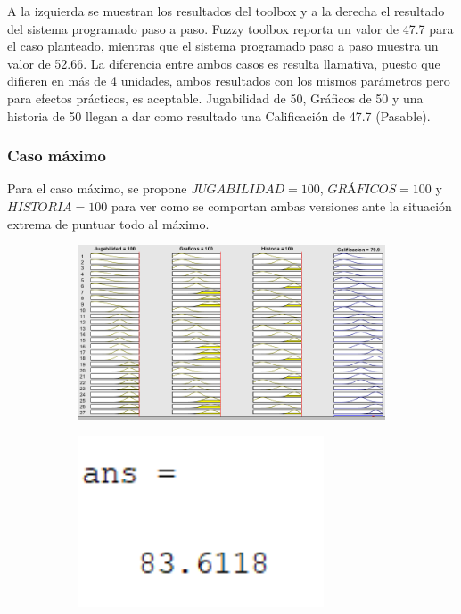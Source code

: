 \documentclass[11pt, letterpaper]{article}
\begin{document}
A la izquierda se muestran los resultados del toolbox y a la derecha el resultado del sistema programado paso a paso. 
Fuzzy toolbox reporta un valor de 47.7 para el caso planteado, mientras que el sistema programado paso a paso muestra un valor de 52.66. La diferencia entre ambos casos es resulta llamativa, puesto que difieren en más de 4 unidades, ambos resultados con los mismos parámetros pero para efectos prácticos, es aceptable. Jugabilidad de 50, Gráficos de 50 y una historia de 50 llegan a dar como resultado una Calificación de 47.7 (Pasable).

\newpage

\subsubsection{Caso máximo}
Para el caso máximo, se propone  $JUGABILIDAD = 100$, $GRÁFICOS = 100$ y $HISTORIA = 100$ para ver como se comportan ambas versiones ante la situación extrema de puntuar todo al máximo.

\begin{figure}[h]
	\centering
	\begin{subfigure}{0.40\textwidth} %
		\centering
		\includegraphics[width=1.4\textwidth]{IMG/RP13.png}
		\label{fig:G7}
	\end{subfigure}
	\hfill
	\begin{subfigure}{0.42\textwidth} %
		\centering
		\includegraphics[width=0.8\textwidth]{IMG/M13.png}
		\label{fig:G8}
	\end{subfigure}
	\label{fig:comparacion4}
\end{figure}
\end{document}
